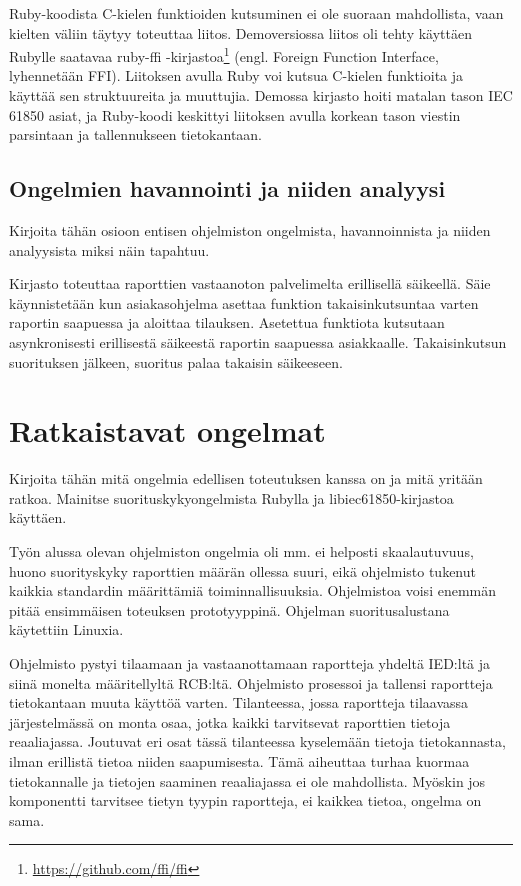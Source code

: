 Ruby-koodista C-kielen funktioiden kutsuminen ei ole suoraan mahdollista, vaan kielten väliin täytyy toteuttaa liitos. Demoversiossa liitos oli tehty käyttäen Rubylle saatavaa ruby-ffi -kirjastoa\footnote{\url{https://github.com/ffi/ffi}} (engl. Foreign Function Interface, lyhennetään FFI). Liitoksen avulla Ruby voi kutsua C-kielen funktioita ja käyttää sen struktuureita ja muuttujia. Demossa kirjasto hoiti matalan tason IEC 61850 asiat, ja Ruby-koodi keskittyi liitoksen avulla korkean tason viestin parsintaan ja tallennukseen tietokantaan.


\subsection{Ongelmien havannointi ja niiden analyysi}
\begin{it}
	Kirjoita tähän osioon entisen ohjelmiston ongelmista, havannoinnista ja niiden analyysista miksi näin tapahtuu.
\end{it}
Kirjasto toteuttaa raporttien vastaanoton palvelimelta erillisellä säikeellä. Säie käynnistetään kun asiakasohjelma asettaa funktion takaisinkutsuntaa varten raportin saapuessa ja aloittaa tilauksen. Asetettua funktiota kutsutaan asynkronisesti erillisestä säikeestä raportin saapuessa asiakkaalle. Takaisinkutsun suorituksen jälkeen, suoritus palaa takaisin säikeeseen.

\section{Ratkaistavat ongelmat}
\begin{it}
	Kirjoita tähän mitä ongelmia edellisen toteutuksen kanssa on ja mitä yritään ratkoa. Mainitse suorituskykyongelmista Rubylla ja libiec61850-kirjastoa käyttäen.
\end{it}

Työn alussa olevan ohjelmiston ongelmia oli mm. ei helposti skaalautuvuus, huono suorityskyky raporttien määrän ollessa suuri, eikä ohjelmisto tukenut kaikkia standardin määrittämiä toiminnallisuuksia. Ohjelmistoa voisi enemmän pitää ensimmäisen toteuksen prototyyppinä. Ohjelman suoritusalustana käytettiin Linuxia.

Ohjelmisto pystyi tilaamaan ja vastaanottamaan raportteja yhdeltä IED:ltä ja siinä monelta määritellyltä RCB:ltä. Ohjelmisto prosessoi ja tallensi raportteja tietokantaan muuta käyttöä varten. Tilanteessa, jossa raportteja tilaavassa järjestelmässä on monta osaa, jotka kaikki tarvitsevat raporttien tietoja reaaliajassa. Joutuvat eri osat tässä tilanteessa kyselemään tietoja tietokannasta, ilman erillistä tietoa niiden saapumisesta. Tämä aiheuttaa turhaa kuormaa tietokannalle ja tietojen saaminen reaaliajassa ei ole mahdollista. Myöskin jos komponentti tarvitsee tietyn tyypin raportteja, ei kaikkea tietoa, ongelma on sama.

